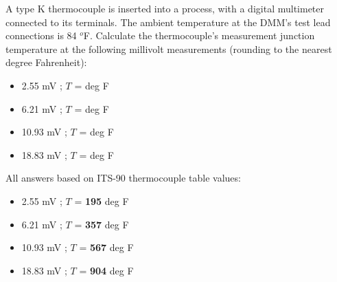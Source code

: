 

A type K thermocouple is inserted into a process, with a digital multimeter connected to its terminals.  The ambient temperature at the DMM's test lead connections is 84 $^{o}$F.  Calculate the thermocouple's measurement junction temperature at the following millivolt measurements (rounding to the nearest degree Fahrenheit):

\begin{itemize}
\item{} 2.55 mV ; $T$ = \underbar{\hskip 50pt} deg F 
\vskip 10pt
\item{} 6.21 mV ; $T$ = \underbar{\hskip 50pt} deg F 
\vskip 10pt
\item{} 10.93 mV ; $T$ = \underbar{\hskip 50pt} deg F
\vskip 10pt
\item{} 18.83 mV ; $T$ = \underbar{\hskip 50pt} deg F 
\end{itemize}







All answers based on ITS-90 thermocouple table values:

\begin{itemize}
\item{} 2.55 mV ; $T$ = {\bf 195} deg F 
\vskip 10pt
\item{} 6.21 mV ; $T$ = {\bf 357} deg F 
\vskip 10pt
\item{} 10.93 mV ; $T$ = {\bf 567} deg F
\vskip 10pt
\item{} 18.83 mV ; $T$ = {\bf 904} deg F 
\end{itemize}










